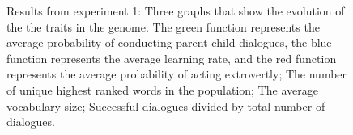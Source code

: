\begin{figure}
    \centering
    \ContinuedFloat
    \hfill
    \par \bigskip
    \hfill
    \caption{Results from experiment 1:  Three graphs that show the evolution of the the traits in the genome. The green function represents the average probability of conducting parent-child dialogues, the blue function represents the average learning rate, and the red function represents the average probability of acting extrovertly;  The number of unique highest ranked words in the population;  The average vocabulary size;  Successful dialogues divided by total number of dialogues.}
    \label{fig:exp1.1}
\end{figure}
